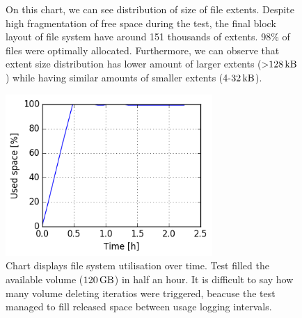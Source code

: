 \documentclass[
  color, %
  table, %
  lof,   %
  lot,   %
]{fithesis3}
\begin{document}
\begin{figure}[h]
    \centering
    \caption[Size distribution of file extents of EXT4 during testing on SSD with regular trimming]{On this chart, we can see distribution of size of file extents. Despite high fragmentation of free space during the test, the final block layout of file system have around 151 thousands of extents. 98\% of files were optimally allocated. Furthermore, we can observe that extent size distribution has lower amount of larger extents (>$\SI{128}{\kilo\byte}$) while having similar amounts of smaller extents (4-$\SI{32}{\kilo\byte}$).}
    \label{fig:used_ext4_ssd}
\end{figure}

\begin{figure}[h]
    \begin{minipage}{\textwidth}
        \centering
        \includegraphics[width=0.7\textwidth]{../charts/SSD_ext4_trim/usage.png}
        \caption[Usage of available space of EXT4 during testing on SSD with regular trimming]{Chart displays file system utilisation over time. Test filled the available volume ($\SI{120}{\giga\byte}$) in half an hour. It is difficult to say how many volume deleting iteratios were triggered, beacuse the test managed to fill released space between usage logging intervals.}
\label{fig:usage_ext4_ssd_trim}
    \end{minipage}
\end{figure}
\end{document}
